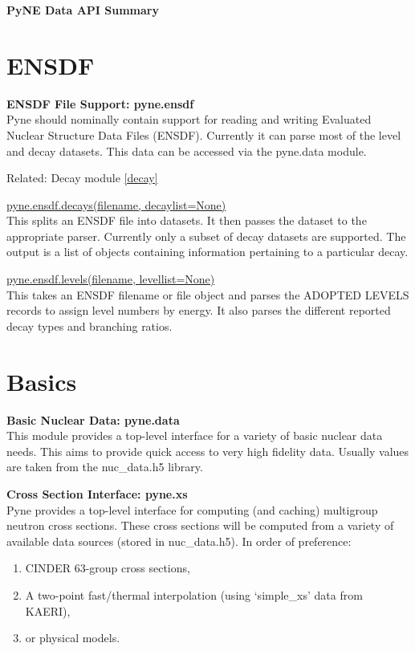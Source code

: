 \documentclass{proposalnsf}
\begin{document}
\begin{center}
\textbf{PyNE Data API Summary}
\end{center}

\section{ENSDF}
\textbf{ENSDF File Support: pyne.ensdf}\label{ensdf}\\
Pyne should nominally contain support for reading and writing Evaluated Nuclear Structure Data Files (ENSDF). Currently it can parse most of the level and decay datasets. This data can be accessed via the pyne.data module.

Related: Decay module \ref{decay}

\underline{pyne.ensdf.decays(filename, decaylist=None)}\\
This splits an ENSDF file into datasets. It then passes the dataset to the appropriate parser. Currently only a subset of decay datasets are supported. The output is a list of objects containing information pertaining to a particular decay.

\underline{pyne.ensdf.levels(filename, levellist=None)}\\
This takes an ENSDF filename or file object and parses the ADOPTED LEVELS records to assign level numbers by energy. It also parses the different reported decay types and branching ratios.

\section{Basics}
\textbf{Basic Nuclear Data: pyne.data}\\
This module provides a top-level interface for a variety of basic nuclear data needs. This aims to provide quick access to very high fidelity data. Usually values are taken from the nuc\_data.h5 library.

\textbf{Cross Section Interface: pyne.xs}\\
Pyne provides a top-level interface for computing (and caching) multigroup neutron cross sections. These cross sections will be computed from a variety of available data sources (stored in nuc\_data.h5). In order of preference:

\begin{enumerate}
\item CINDER 63-group cross sections,
\item A two-point fast/thermal interpolation (using ‘simple\_xs’ data from KAERI),
\item or physical models.
\end{enumerate}
\end{document}
